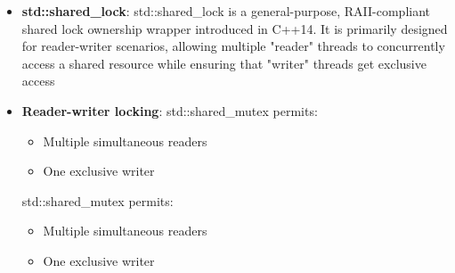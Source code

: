 \documentclass{report}
\begin{document}
\begin{itemize}
\begin{cppcode}
{{                    if (queue.empty() && finished) {
                        break;
                    }

                    int value = queue.front();
                    queue.pop();

                    lock.unlock();
                    process(value);
                }
            }
            \end{cppcode}
            \bigbreak \noindent 
            The predicate must be checked because:
            \begin{itemize}
                \item Wakeups can be spurious.
                \item Another consumer may take the item first.
                \item A notification means the state may have changed, not that the condition is definitely true.
            \end{itemize}
            \textbf{Note:} A spurious wakeup occurs when a thread wakes up from a waiting state (sleeping/blocked on a condition variable or monitor) without receiving any explicit signal, notification, or interrupt, and before the condition it is waiting for has actually been met.
            \bigbreak \noindent 
            The actual condition is the protected shared state, such as !queue.empty(). The condition variable is only the notification mechanism.
        \item \textbf{std::shared\_lock}: std::shared\_lock is a general-purpose, RAII-compliant shared lock ownership wrapper introduced in C++14. It is primarily designed for reader-writer scenarios, allowing multiple "reader" threads to concurrently access a shared resource while ensuring that "writer" threads get exclusive access
        \item \textbf{Reader-writer locking}: std::shared\_mutex permits:
            \begin{itemize}
                \item Multiple simultaneous readers
                \item One exclusive writer
            \end{itemize}
            std::shared\_mutex permits:
            \begin{itemize}
                \item Multiple simultaneous readers
                \item One exclusive writer
            \end{itemize}

\end{itemize}
\end{document}

